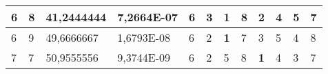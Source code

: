 \documentclass[conference]{IEEEtran}
\begin{document}
\begin{table*}[]
\begin{tabular}{|llll|llllllll|}
\multicolumn{1}{|l|}{6}                                                     & \multicolumn{1}{l|}{8}                                                        & \multicolumn{1}{l|}{41,2444444}                                                   & 7,2664E-07                     & \multicolumn{1}{l|}{6}                                                  & \multicolumn{1}{l|}{3}                                                  & \multicolumn{1}{l|}{\textbf{1}}                                         & \multicolumn{1}{l|}{8}                                                  & \multicolumn{1}{l|}{2}                                                  & \multicolumn{1}{l|}{4}                                                  & \multicolumn{1}{l|}{5}                                                  & 7                          \\ \hline
\multicolumn{1}{|l|}{6}                                                     & \multicolumn{1}{l|}{9}                                                        & \multicolumn{1}{l|}{49,6666667}                                                   & 1,6793E-08                     & \multicolumn{1}{l|}{6}                                                  & \multicolumn{1}{l|}{2}                                                  & \multicolumn{1}{l|}{\textbf{1}}                                         & \multicolumn{1}{l|}{7}                                                  & \multicolumn{1}{l|}{3}                                                  & \multicolumn{1}{l|}{5}                                                  & \multicolumn{1}{l|}{4}                                                  & 8                          \\ \hline
\multicolumn{1}{|l|}{7}                                                     & \multicolumn{1}{l|}{7}                                                        & \multicolumn{1}{l|}{50,9555556}                                                   & 9,3744E-09                     & \multicolumn{1}{l|}{6}                                                  & \multicolumn{1}{l|}{2}                                                  & \multicolumn{1}{l|}{5}                                                  & \multicolumn{1}{l|}{8}                                                  & \multicolumn{1}{l|}{\textbf{1}}                                         & \multicolumn{1}{l|}{4}                                                  & \multicolumn{1}{l|}{3}                                                  & 7                          \\ \hline

\end{tabular}
\end{table*}
\end{document}

